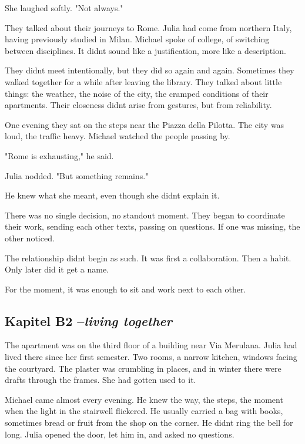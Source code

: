 \documentclass[
]{article}
\begin{document}
She laughed softly. "Not always."

They talked about their journeys to Rome. Julia had come from northern Italy, having previously studied in Milan. Michael spoke of college, of switching between disciplines. It didn\textquotesingle t sound like a justification, more like a description.

They didn\textquotesingle t meet intentionally, but they did so again and again. Sometimes they walked together for a while after leaving the library. They talked about little things: the weather, the noise of the city, the cramped conditions of their apartments. Their closeness didn\textquotesingle t arise from gestures, but from reliability.

One evening they sat on the steps near the Piazza della Pilotta. The city was loud, the traffic heavy. Michael watched the people passing by.

"Rome is exhausting," he said.

Julia nodded. "But something remains."

He knew what she meant, even though she didn\textquotesingle t explain it.

There was no single decision, no standout moment. They began to coordinate their work, sending each other texts, passing on questions. If one was missing, the other noticed.

The relationship didn\textquotesingle t begin as such. It was first a collaboration. Then a habit. Only later did it get a name.

For the moment, it was enough to sit and work next to each other.

\subsection{\texorpdfstring{Kapitel B2 --\emph{living together}}{Kapitel B2 --living together}}\label{kapitel-b2-living-together}

The apartment was on the third floor of a building near Via Merulana. Julia had lived there since her first semester. Two rooms, a narrow kitchen, windows facing the courtyard. The plaster was crumbling in places, and in winter there were drafts through the frames. She had gotten used to it.

Michael came almost every evening. He knew the way, the steps, the moment when the light in the stairwell flickered. He usually carried a bag with books, sometimes bread or fruit from the shop on the corner. He didn\textquotesingle t ring the bell for long. Julia opened the door, let him in, and asked no questions.
\end{document}
